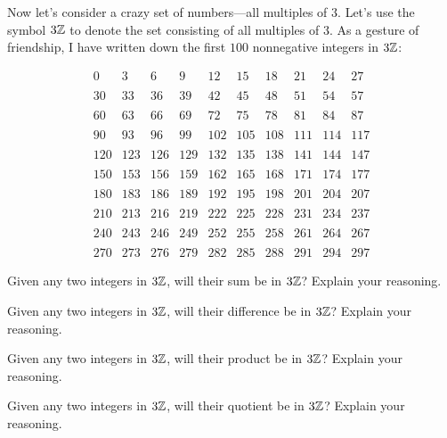 \documentclass{ximera}
\begin{document}
Now let's consider a crazy set of numbers---all multiples of
$3$. Let's use the symbol $3\mathbb Z$ to denote the set consisting of all
multiples of $3$. As a gesture of friendship, I have written down the
first $100$ nonnegative integers in $3\mathbb Z$:


\[
\begin{array}{cccccccccc}
0   & 3   & 6   & 9   & 12  & 15  & 18  & 21  & 24  & 27  \\
\\
30  & 33  & 36  & 39  & 42  & 45  & 48  & 51  & 54  & 57  \\
\\
60  & 63  & 66  & 69  & 72  & 75  & 78  & 81  & 84  & 87  \\
\\
90  & 93  & 96  & 99  & 102 & 105 & 108 & 111 & 114 & 117 \\
\\
120 & 123 & 126 & 129 & 132 & 135 & 138 & 141 & 144 & 147 \\
\\
150 & 153 & 156 & 159 & 162 & 165 & 168 & 171 & 174 & 177 \\
\\
180 & 183 & 186 & 189 & 192 & 195 & 198 & 201 & 204 & 207 \\
\\
210 & 213 & 216 & 219 & 222 & 225 & 228 & 231 & 234 & 237 \\
\\
240 & 243 & 246 & 249 & 252 & 255 & 258 & 261 & 264 & 267 \\
\\
270 & 273 & 276 & 279 & 282 & 285 & 288 & 291 & 294 & 297
\end{array}
\]



\begin{question}
Given any two integers in $3\mathbb Z$, will their sum be in $3\mathbb Z$? Explain
your reasoning.
\end{question}

\begin{question}
Given any two integers in $3\mathbb Z$, will their difference be in $3\mathbb Z$?
Explain your reasoning.
\end{question}

\begin{question}
Given any two integers in $3\mathbb Z$, will their product be in $3\mathbb Z$?
Explain your reasoning.
\end{question}

\begin{question}
Given any two integers in $3\mathbb Z$, will their quotient be in $3\mathbb Z$?
Explain your reasoning.
\end{question}
\end{document}
